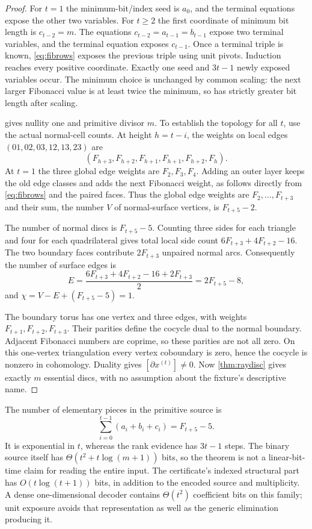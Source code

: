 \documentclass[11pt,a4paper]{article}
\theoremstyle{definition}
\begin{document}
\begin{proof}
For $t=1$ the minimum-bit/index seed is $a_0$, and the terminal equations expose
the other two variables.  For $t\ge2$ the first coordinate of minimum bit
length is $c_{t-2}=m$.  The equations $c_{t-2}=a_{t-1}=b_{t-1}$ expose two
terminal variables, and the terminal equation exposes $c_{t-1}$.  Once a
terminal triple is known, \cref{eq:fibrows} exposes the previous triple using
unit pivots.  Induction reaches every positive coordinate.  Exactly one seed
and $3t-1$ newly exposed variables occur.  The minimum choice is unchanged by
common scaling: the next larger Fibonacci value is at least twice the
minimum, so has strictly greater bit length after scaling.

 gives nullity one and primitive divisor $m$.  To establish
the topology for all $t$, use the actual normal-cell counts.  At height
$h=t-i$, the weights on local edges $(01,02,03,12,13,23)$ are
\[
 (F_{h+3},F_{h+2},F_{h+1},F_{h+1},F_{h+2},F_h).
\]
At $t=1$ the three global edge weights are $F_2,F_3,F_4$.
Adding an outer layer keeps the
old edge classes and adds the next Fibonacci weight, as follows directly
from \cref{eq:fibrows} and the paired faces.  Thus the global edge weights
are $F_2,\ldots,F_{t+3}$ and their sum, the number $V$ of normal-surface
vertices, is $F_{t+5}-2$.

The number of normal discs is $F_{t+5}-5$.  Counting three sides for each
triangle and four for each quadrilateral gives total local side count
$6F_{t+3}+4F_{t+2}-16$.  The two boundary faces contribute
$2F_{t+3}$ unpaired normal arcs.  Consequently the number of surface edges is
\[
 E=\frac{6F_{t+3}+4F_{t+2}-16+2F_{t+3}}2
   =2F_{t+5}-8,
\]
and $\chi=V-E+(F_{t+5}-5)=1$.

The boundary torus has one vertex and three edges, with weights
$F_{t+1},F_{t+2},F_{t+3}$.  Their parities define the cocycle dual to the
normal boundary.  Adjacent Fibonacci numbers are coprime, so these parities
are not all zero.  On this one-vertex triangulation every vertex coboundary
is zero, hence the cocycle is nonzero in cohomology.  Duality gives
$[\partial x^{(t)}]\ne0$.  Now \cref{thm:raydisc} gives exactly $m$ essential
discs, with no assumption about the fixture's descriptive name.
\end{proof}

The number of elementary pieces in the primitive source is
\[
 \sum_{i=0}^{t-1}(a_i+b_i+c_i)=F_{t+5}-5.
\]
It is exponential in $t$, whereas the rank evidence has $3t-1$ steps.  The
binary source itself has $\Theta(t^2+t\log(m+1))$ bits, so the theorem is
not a linear-bit-time claim for reading the entire input.  The certificate's
indexed structural part has $O(t\log(t+1))$ bits, in addition to the encoded
source and multiplicity.  A dense one-dimensional decoder contains
$\Theta(t^2)$ coefficient bits on this family; unit exposure avoids that
representation as well as the generic elimination producing it.
\end{document}
